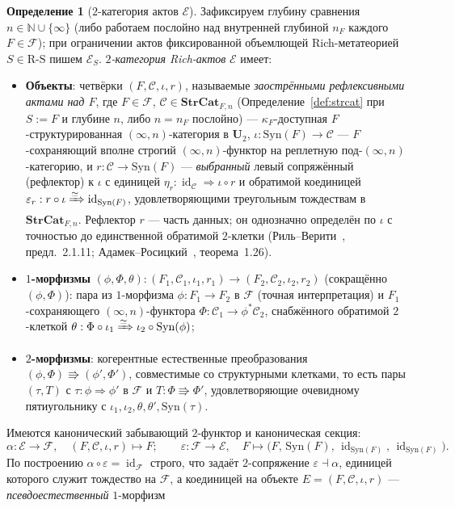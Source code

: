 \documentclass[11pt]{article}
\theoremstyle{plain}
\theoremstyle{definition}
\newtheorem{definition}[theorem]{Определение}
\newcommand{\RS}{\mathrm{R\text{-}S}}
\newcommand{\cF}{\mathcal{F}}
\newcommand{\cC}{\mathcal{C}}
\newcommand{\Syn}{\mathrm{Syn}}
\newcommand{\cE}{\mathcal{E}}
\DeclareMathOperator{\id}{id}
\begin{document}
\begin{definition}[$2$-категория актов $\cE$]\label{def:enactments}
Зафиксируем глубину сравнения $n \in \mathbb{N} \cup \{\infty\}$ (либо работаем послойно над внутренней глубиной $n_F$ каждого $F \in \cF$); при ограничении актов фиксированной объемлющей Rich-метатеорией $S \in \RS$ пишем $\cE_S$. \emph{$2$-категория Rich-актов} $\cE$ имеет:
\begin{itemize}
\item \textbf{Объекты}: четвёрки $(F, \cC, \iota, r)$, называемые \emph{заострёнными рефлексивными актами над $F$}, где $F \in \cF$, $\cC \in \mathbf{StrCat}_{F, n}$ (Определение~\ref{def:strcat} при $S := F$ и глубине $n$, либо $n = n_F$ послойно) — $\kappa_F$-доступная $F$-структурированная $(\infty, n)$-категория в $\mathbf{U}_2$, $\iota : \Syn(F) \to \cC$ — $F$-сохраняющий вполне строгий $(\infty, n)$-функтор на реплетную под-$(\infty, n)$-категорию, и $r : \cC \to \Syn(F)$ — \emph{выбранный} левый сопряжённый (рефлектор) к $\iota$ с единицей $\eta_r : \id_\cC \Rightarrow \iota \circ r$ и обратимой коединицей $\varepsilon_r : r \circ \iota \xRightarrow{\simeq} \id_{\Syn(F)}$, удовлетворяющими треугольным тождествам в $\mathbf{StrCat}_{F, n}$. Рефлектор $r$ — часть данных; он однозначно определён по $\iota$ с точностью до единственной обратимой $2$-клетки (Риль--Верити~\cite{RiehlVerity2022}, предл.~2.1.11; Адамек--Росицкий~\cite{AdamekRosicky1994}, теорема~1.26).
\item \textbf{$1$-морфизмы} $(\phi, \Phi, \theta) : (F_1, \cC_1, \iota_1, r_1) \to (F_2, \cC_2, \iota_2, r_2)$ (сокращённо $(\phi, \Phi)$): пара из $1$-морфизма $\phi : F_1 \to F_2$ в $\cF$ (точная интерпретация) и $F_1$-сохраняющего $(\infty, n)$-функтора $\Phi : \cC_1 \to \phi^*\cC_2$, снабжённого обратимой $2$-клеткой $\theta : \Phi \circ \iota_1 \xRightarrow{\simeq} \iota_2 \circ \Syn(\phi)$;
\item \textbf{$2$-морфизмы}: когерентные естественные преобразования $(\phi, \Phi) \Rrightarrow (\phi', \Phi')$, совместимые со структурными клетками, то есть пары $(\tau, T)$ с $\tau : \phi \Rightarrow \phi'$ в $\cF$ и $T : \Phi \Rrightarrow \Phi'$, удовлетворяющие очевидному пятиугольнику с $\iota_1, \iota_2, \theta, \theta', \Syn(\tau)$.
\end{itemize}
Имеются канонический забывающий $2$-функтор и каноническая секция:
\[
  \alpha : \cE \to \cF, \quad (F, \cC, \iota, r) \mapsto F; \qquad
  \varepsilon : \cF \to \cE, \quad F \mapsto \bigl(F,\, \Syn(F),\, \id_{\Syn(F)},\, \id_{\Syn(F)}\bigr).
\]
По построению $\alpha \circ \varepsilon = \id_\cF$ строго, что задаёт $2$-сопряжение $\varepsilon \dashv \alpha$, единицей которого служит тождество на $\cF$, а коединицей на объекте $E = (F, \cC, \iota, r)$ — \emph{псевдоестественный} $1$-морфизм

\end{definition}
\end{document}
